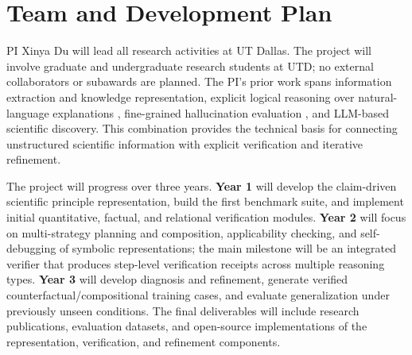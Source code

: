\documentclass[12pt]{article}
\begin{document}
\section*{Team and Development Plan}

PI Xinya Du will lead all research activities at UT Dallas. The project will involve graduate and undergraduate research students at UTD; no external collaborators or subawards are planned. The PI's prior work spans information extraction and knowledge representation, explicit logical reasoning over natural-language explanations \citep{han2023clore}, fine-grained hallucination evaluation \citep{jing2024faithscore}, and LLM-based scientific discovery. This combination provides the technical basis for connecting unstructured scientific information with explicit verification and iterative refinement.

The project will progress over three years. \textbf{Year 1} will develop the claim-driven scientific principle representation, build the first benchmark suite, and implement initial quantitative, factual, and relational verification modules. \textbf{Year 2} will focus on multi-strategy planning and composition, applicability checking, and self-debugging of symbolic representations; the main milestone will be an integrated verifier that produces step-level verification receipts across multiple reasoning types. \textbf{Year 3} will develop diagnosis and refinement, generate verified counterfactual/compositional training cases, and evaluate generalization under previously unseen conditions. The final deliverables will include research publications, evaluation datasets, and open-source implementations of the representation, verification, and refinement components.

\clearpage


\end{document}
